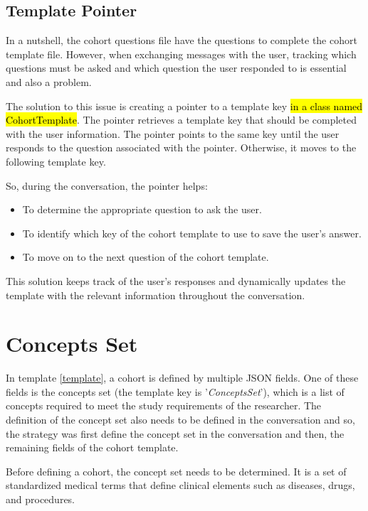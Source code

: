 \subsection{Template Pointer}

In a nutshell, the cohort questions file have the questions to complete the cohort template file. However, when exchanging messages with the user, tracking which questions must be asked and which question the user responded to is essential and also a problem.

The solution to this issue is creating a pointer to a template key \hl{in a class named CohortTemplate}. The pointer retrieves a template key that should be completed with the user information. The pointer points to the same key until the user responds to the question associated with the pointer. Otherwise, it moves to the following template key.

So, during the conversation, the pointer helps:

\begin{itemize}
  \item To determine the appropriate question to ask the user.
  \item To identify which key of the cohort template to use to save the user's answer.
  \item To move on to the next question of the cohort template.
\end{itemize}

This solution keeps track of the user's responses and dynamically updates the template with the relevant information throughout the conversation.


\section{Concepts Set}


In template \ref{template}, a cohort is defined by multiple JSON fields. One of these fields is the concepts set (the template key is '\textit{ConceptsSet}'), which is a list of concepts required to meet the study requirements of the researcher. The definition of the concept set also needs to be defined in the conversation and so, the strategy was first define the concept set in the conversation and then, the remaining fields of the cohort template.

Before defining a cohort, the concept set needs to be determined. It is a set of standardized medical terms that define clinical elements such as diseases, drugs, and procedures.

